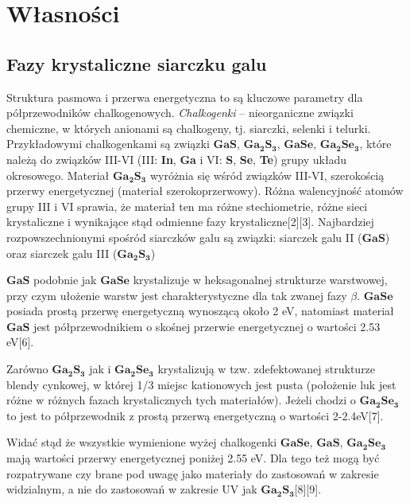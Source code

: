 \newpage
\pagestyle{plain}
\section{Własności}

\subsection{Fazy krystaliczne siarczku galu}
Struktura pasmowa i przerwa energetyczna to są kluczowe parametry dla półprzewodników chalkogenowych. \textit{Chalkogenki} – nieorganiczne związki chemiczne, w których anionami są chalkogeny, tj. siarczki, selenki i telurki. Przykładowymi chalkogenkami są związki $\mathbf{GaS}$, $\mathbf{Ga_{2}S_{3}}$, $\mathbf{GaSe}$, $\mathbf{Ga_{2}Se_{3}}$, które należą do związków III-VI (III: \textbf{In}, \textbf{Ga} i VI: \textbf{S}, \textbf{Se}, \textbf{Te}) grupy układu okresowego. Materiał  $\mathbf{Ga_{2}S_{3}}$ wyróżnia się wśród związków III-VI, szerokością przerwy energetycznej (materiał szerokoprzerwowy). Różna walencyjność atomów grupy III i VI sprawia, że materiał ten ma różne stechiometrie, różne sieci krystaliczne i wynikające stąd odmienne fazy krystaliczne[2][3]. Najbardziej rozpowszechnionymi spośród siarczków galu są związki: siarczek galu II ($\mathbf{GaS}$) oraz siarczek galu III ($\mathbf{Ga_{2}S_{3}}$) 

$\mathbf{GaS}$ podobnie jak $\mathbf{GaSe}$ krystalizuje w heksagonalnej strukturze warstwowej, przy czym ułożenie warstw jest charakterystyczne dla tak zwanej fazy $\beta$. $\mathbf{GaSe}$ posiada prostą przerwę energetyczną wynoszącą około 2 eV, natomiast materiał $\mathbf{GaS}$ jest półprzewodnikiem o skośnej przerwie energetycznej o wartości 2.53 eV[6].

Zarówno $\mathbf{Ga_{2}S_{3}}$ jak i $\mathbf{Ga_{2}Se_{3}}$ krystalizują w tzw. zdefektowanej strukturze blendy cynkowej, w której 1/3 miejsc kationowych jest pusta (położenie luk jest różne w różnych fazach krystalicznych tych materiałów). Jeżeli chodzi o $\mathbf{Ga_{2}Se_{3}}$ to jest to półprzewodnik z prostą przerwą energetyczną o wartości 2-2.4eV[7].

Widać stąd że wszystkie wymienione wyżej chalkogenki $\mathbf{GaSe}$, $\mathbf{GaS}$, $\mathbf{Ga_{2}Se_{3}}$ mają wartości przerwy energetycznej poniżej 2.55 eV. Dla tego też mogą być rozpatrywane czy brane pod uwagę jako materiały do zastosowań w zakresie widzialnym, a nie do zastosowań w zakresie UV jak $\mathbf{Ga_{2}S_{3}}$[8][9].

